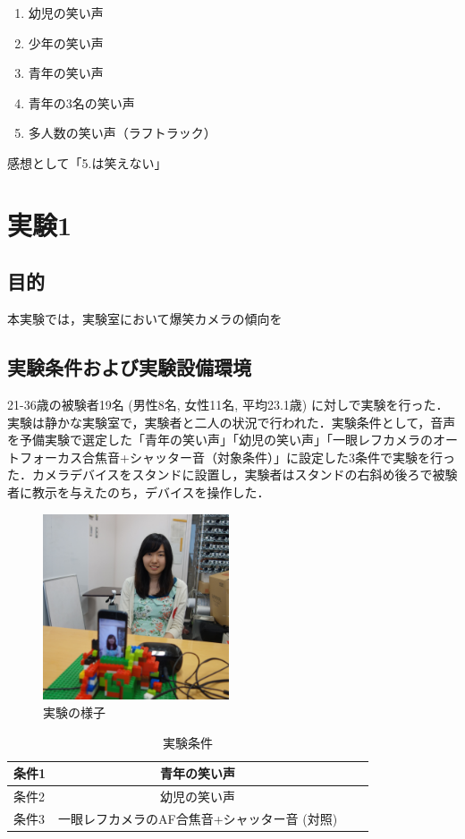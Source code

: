 \documentclass[submit,techreq]{ec2014}
\begin{document}
\begin{enumerate}
 \item 幼児の笑い声
 \item 少年の笑い声
 \item 青年の笑い声
 \item 青年の3名の笑い声
 \item 多人数の笑い声（ラフトラック）
\end{enumerate}

感想として「5.は笑えない」

\section{実験1}
\subsection{目的}

本実験では，実験室において爆笑カメラの傾向を

\subsection{実験条件および実験設備環境}

21-36歳の被験者19名 (男性8名, 女性11名, 平均23.1歳) に対しで実験を行った．実験は静かな実験室で，実験者と二人の状況で行われた．実験条件として，音声を予備実験で選定した「青年の笑い声」「幼児の笑い声」「一眼レフカメラのオートフォーカス合焦音+シャッター音（対象条件）」に設定した3条件で実験を行った．カメラデバイスをスタンドに設置し，実験者はスタンドの右斜め後ろで被験者に教示を与えたのち，デバイスを操作した．

\begin{figure}[h!]
  \centering  
\includegraphics[width=55mm, bb=0 0 2312 2312]{images/DSC05173.jpg}
\caption{実験の様子}
  \label{recursive}
\end{figure}


\begin{table}[htb]
  \begin{center}
    \caption{実験条件}
    \begin{tabular}{|l|c|r||r|} \hline
      条件1 & 青年の笑い声 \\ \hline 
      条件2 & 幼児の笑い声 \\ \hline
      条件3 & 一眼レフカメラのAF合焦音+シャッター音 (対照) \\ \hline
    \end{tabular}
    \label{tab:price}
  \end{center}
\end{table}
\end{document}

